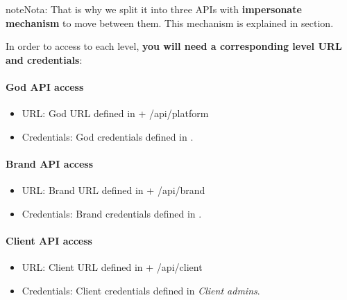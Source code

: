 \documentclass[letterpaper,10pt,spanish]{sphinxmanual}
\begin{document}
\begin{notice}{note}{Nota:}
That is why we split it into three APIs with \textbf{impersonate mechanism} to move between them. This mechanism is
explained in {\hyperref[api_rest/use_case:use\string-case]{}} section.
\end{notice}

In order to access to each level, \textbf{you will need a corresponding level URL and credentials}:
\paragraph{God API access}
\begin{itemize}
\item {} 
URL: God URL defined in {\hyperref[administration_portal/platform/portals:platform\string-portals]{}} + /api/platform

\item {} 
Credentials: God credentials defined in {\hyperref[administration_portal/platform/main_operators:main\string-operators]{}}.

\end{itemize}
\paragraph{Brand API access}
\begin{itemize}
\item {} 
URL: Brand URL defined in {\hyperref[administration_portal/platform/brands:brand\string-portals]{}} + /api/brand

\item {} 
Credentials: Brand credentials defined in {\hyperref[administration_portal/platform/brands:brand\string-operators]{}}.

\end{itemize}
\paragraph{Client API access}
\begin{itemize}
\item {} 
URL: Client URL defined in {\hyperref[administration_portal/brand/settings/client_portals:client\string-portals]{}} + /api/client

\item {} 
Credentials: Client credentials defined in {\hyperref[administration_portal/brand/clients/wholesale:additional\string-subsections]{}} \emph{Client admins}.

\end{itemize}
\end{document}
